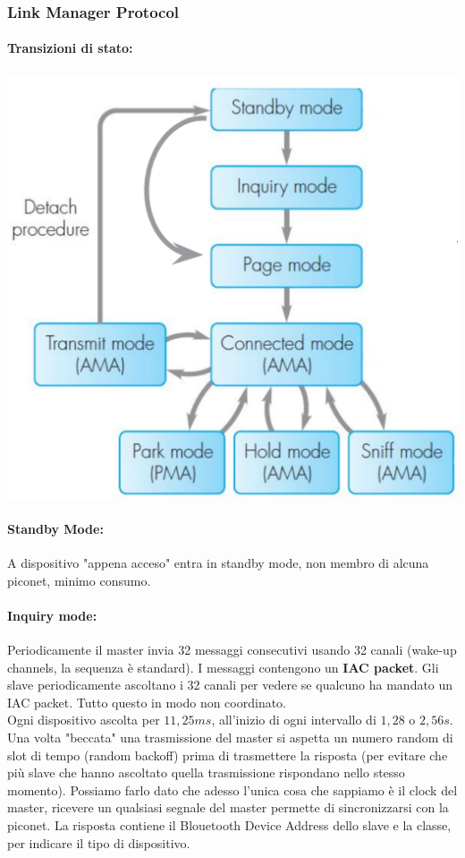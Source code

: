 \newpage

\subsubsection{Link Manager Protocol}
\paragraph{Transizioni di stato:}
\begin{center}
	\includegraphics[width=0.55\linewidth]{img/wpan/lmpst}
\end{center}

\paragraph{Standby Mode:} A dispositivo "appena acceso" entra in standby mode, non membro di alcuna piconet, minimo consumo.\\

\paragraph{Inquiry mode:} Periodicamente il master invia 32 messaggi consecutivi usando 32 canali (wake-up channels, la sequenza  è standard). I messaggi contengono un \textbf{IAC packet}. Gli slave periodicamente ascoltano i 32 canali per vedere se qualcuno ha mandato un IAC packet. Tutto questo in modo non coordinato.\\

Ogni dispositivo ascolta per $11,25 ms$, all'inizio di ogni intervallo di $1,28$ o $2,56 s$. Una volta "beccata" una trasmissione del master si aspetta un numero random di slot di tempo (random backoff) prima di trasmettere la risposta (per evitare che più slave che hanno ascoltato quella trasmissione rispondano nello stesso momento). Possiamo farlo dato che adesso l'unica cosa che sappiamo è il clock del master, ricevere un qualsiasi segnale del master permette di sincronizzarsi con la piconet. La risposta contiene il Blouetooth Device Address dello slave e la classe, per indicare il tipo di dispositivo.\\

